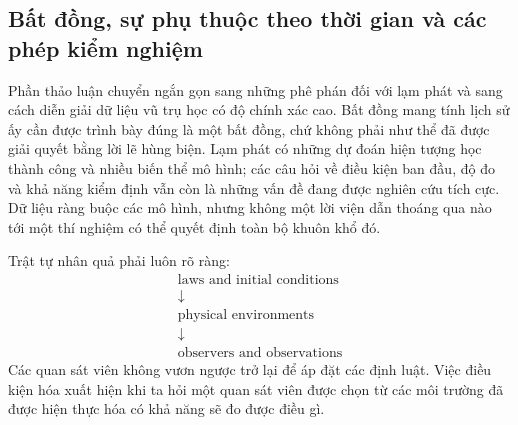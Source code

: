 \subsection{Bất đồng, sự phụ thuộc theo thời gian và các phép kiểm nghiệm}

Phần thảo luận chuyển ngắn gọn sang những phê phán đối với lạm phát và sang cách diễn giải dữ liệu vũ trụ học có độ chính xác cao. Bất đồng mang tính lịch sử ấy cần được trình bày đúng là một bất đồng, chứ không phải như thể đã được giải quyết bằng lời lẽ hùng biện. Lạm phát có những dự đoán hiện tượng học thành công và nhiều biến thể mô hình; các câu hỏi về điều kiện ban đầu, độ đo và khả năng kiểm định vẫn còn là những vấn đề đang được nghiên cứu tích cực. Dữ liệu ràng buộc các mô hình, nhưng không một lời viện dẫn thoáng qua nào tới một thí nghiệm có thể quyết định toàn bộ khuôn khổ đó.

\begin{classroomqa}
\end{classroomqa}

\begin{classroomqa}
\end{classroomqa}

Trật tự nhân quả phải luôn rõ ràng:
\begin{equation}
\begin{gathered}
\text{laws and initial conditions}\\[-0.15em]
\downarrow\\[-0.15em]
\text{physical environments}\\[-0.15em]
\downarrow\\[-0.15em]
\text{observers and observations}
\end{gathered}
\end{equation}
Các quan sát viên không vươn ngược trở lại để áp đặt các định luật. Việc điều kiện hóa xuất hiện khi ta hỏi một quan sát viên được chọn từ các môi trường đã được hiện thực hóa có khả năng sẽ đo được điều gì.


